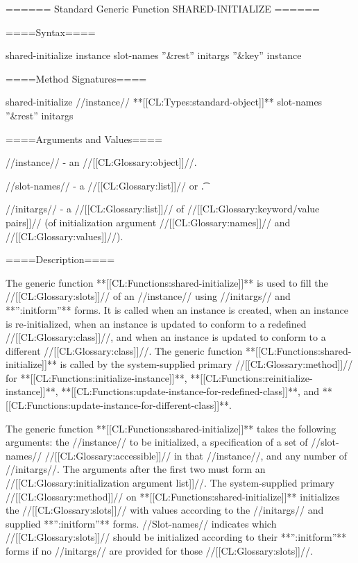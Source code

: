 ====== Standard Generic Function SHARED-INITIALIZE ======

====Syntax====


\DefgenWithValues shared-initialize {instance slot-names ''&rest'' initargs ''&key'' {\allowotherkeys}} {instance}


====Method Signatures====

\Defmeth shared-initialize {//instance// **[[CL:Types:standard-object]]** slot-names ''&rest'' initargs}

====Arguments and Values====

//instance// - an //[[CL:Glossary:object]]//.

//slot-names// - a //[[CL:Glossary:list]]// or \t.

//initargs// - a //[[CL:Glossary:list]]// of //[[CL:Glossary:keyword/value pairs]]// (of initialization argument //[[CL:Glossary:names]]// and //[[CL:Glossary:values]]//).

====Description====

The generic function **[[CL:Functions:shared-initialize]]** is used to fill the //[[CL:Glossary:slots]]// of an //instance// using //initargs// and **'':initform''** forms. It is called when an instance is created, when an instance is re-initialized, when an instance is updated to conform to a redefined //[[CL:Glossary:class]]//, and when an instance is updated to conform to a different //[[CL:Glossary:class]]//. The generic function **[[CL:Functions:shared-initialize]]** is called by the system-supplied primary //[[CL:Glossary:method]]// for **[[CL:Functions:initialize-instance]]**, **[[CL:Functions:reinitialize-instance]]**, **[[CL:Functions:update-instance-for-redefined-class]]**, and **[[CL:Functions:update-instance-for-different-class]]**.

The generic function **[[CL:Functions:shared-initialize]]** takes the following arguments: the //instance// to be initialized, a specification of a set of //slot-names// //[[CL:Glossary:accessible]]// in that //instance//, and any number of //initargs//. The arguments after the first two must form an //[[CL:Glossary:initialization argument list]]//. The system-supplied primary //[[CL:Glossary:method]]// on **[[CL:Functions:shared-initialize]]** initializes the //[[CL:Glossary:slots]]// with values according to the //initargs// and supplied **'':initform''** forms. //Slot-names// indicates which //[[CL:Glossary:slots]]// should be initialized according to their **'':initform''** forms if no //initargs// are provided for those //[[CL:Glossary:slots]]//.

